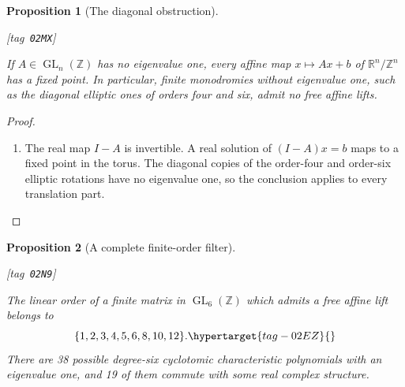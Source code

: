 \documentclass[11pt,a4paper]{article}
\numberwithin{equation}{section}
\newtheorem{proposition}[proposition]{Proposition}
\theoremstyle{definition}
\newcommand{\StatementRecord}[4]{{\upshape\footnotesize[tag~\texttt{#3}]}\enspace\ignorespaces}
\begin{document}
\begin{proposition}[The diagonal obstruction]\hypertarget{tag-02MX}{}\label{maps:src:F.1.4}
\StatementRecord{maps:src:F.1.4}{proved}{02MX}{the definitions and constructions stated in the proof}


If $A\in\operatorname{GL}_n(\mathbb Z)$ has no eigenvalue one,
every affine map $x\mapsto Ax+b$ of $\mathbb R^n/\mathbb Z^n$
has a fixed point.  In particular, finite monodromies without eigenvalue one, such as the diagonal elliptic ones of orders four and six, admit no free affine lifts.

\end{proposition}


\begin{proof}
\begin{enumerate}[label=\arabic*.]
\item The real map $I-A$ is invertible.  A real solution of
$(I-A)x=b$ maps to a fixed point in the torus.  The diagonal
copies of the order-four and order-six elliptic rotations have
no eigenvalue one, so the conclusion applies to every translation
part.

\end{enumerate}
\end{proof}









\begin{proposition}[A complete finite-order filter]\hypertarget{tag-02N9}{}\hypertarget{tag-02R8}{}\label{maps:src:F.2.2}
\StatementRecord{maps:src:F.2.2}{proved}{02N9}{\cref{maps:src:F.1.4}}


The linear order of a finite matrix in $\operatorname{GL}_6(\mathbb Z)$
which admits a free affine lift belongs to
\begin{equation}
 \{1,2,3,4,5,6,8,10,12\}.
 \hypertarget{tag-02EZ}{}\label{maps:eq:F.3}
\end{equation}
There are 38 possible degree-six cyclotomic characteristic
polynomials with an eigenvalue one, and 19 of them commute
with some real complex structure.

\end{proposition}
\end{document}
